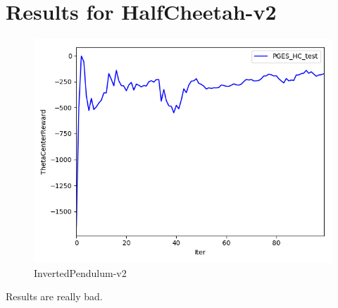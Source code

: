 \documentclass{article}
\begin{document}
\newpage
\section{Results for HalfCheetah-v2}

\begin{figure}[htbp]
	\centering
	\includegraphics[width=1.00\textwidth]{PGES_HC_test.png}
	\caption{InvertedPendulum-v2}\label{fig:digit}
\end{figure}

\large{Results are really bad.}
	
\end{document}
